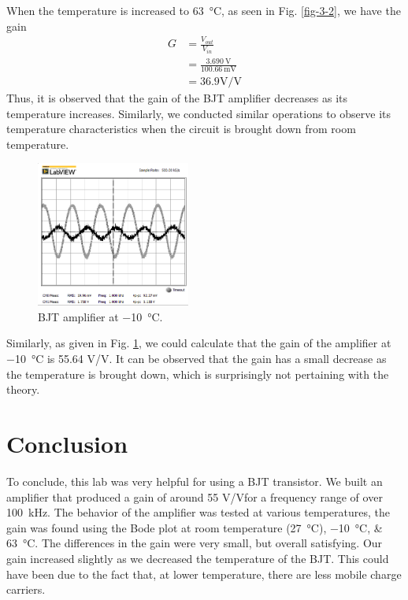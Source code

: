 \documentclass[journal]{IEEEtran}
\begin{document}
When the temperature is increased to \SI{63}{\celsius}, as seen in Fig. \ref{fig-3-2}, we have the gain
\begin{equation*}
  \begin{split}
    G&=\frac{V_{out}}{V_{in}}\\
    &=\frac{\SI{3.690}{\volt}}{\SI{100.66}{\milli\volt}}\\
    &=36.9 \si{\volt}/\si{\volt}
  \end{split}
\end{equation*}
Thus, it is observed that the gain of the BJT amplifier decreases as its temperature increases.
Similarly, we conducted similar operations to observe its temperature characteristics when the
circuit is brought down from room temperature.
\begin{figure}[h]
  \includegraphics[width=0.45\textwidth]{images/-10degree.png}
  \caption{BJT amplifier at \SI{-10}{\celsius}.}
  \label{fig-3-3}%
\end{figure}
Similarly, as given in Fig. \ref{fig-3-3}, we could calculate that
the gain of the amplifier at \SI{-10}{\celsius} is 55.64 \si{\volt}/\si{\volt}. It
can be observed that the gain has a small decrease as the temperature is brought down,
which is surprisingly not pertaining with the theory.

\section{Conclusion}
\par To conclude, this lab was very helpful for using a BJT transistor. We built an amplifier that produced a gain of around 55 \si{\volt}/\si{\volt}for a frequency range of over \SI{100}{\kilo\hertz}.
The behavior of the amplifier was tested at various temperatures, the gain was found using the Bode plot at room temperature (\SI{27}{\celsius}), \SIlist{-10;63}{\celsius}. The differences in the gain were very small, but overall satisfying. Our gain increased slightly as we decreased the temperature of the BJT. This could have been due to the fact that, at lower temperature, there are less mobile charge carriers.
\end{document}
